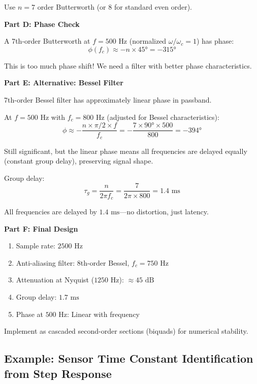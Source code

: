 \begin{example}
Use $n = 7$ order Butterworth (or 8 for standard even order).

\textbf{Part D: Phase Check}

A 7th-order Butterworth at $f = 500\text{ Hz}$ (normalized $\omega/\omega_c = 1$) has phase:
\begin{equation}
\phi(f_c) \approx -n \times 45° = -315°
\end{equation}

This is too much phase shift! We need a filter with better phase characteristics.

\textbf{Part E: Alternative: Bessel Filter}

7th-order Bessel filter has approximately linear phase in passband.

At $f = 500\text{ Hz}$ with $f_c = 800\text{ Hz}$ (adjusted for Bessel characteristics):
\begin{equation}
\phi \approx -\frac{n \times \pi/2 \times f}{f_c} = -\frac{7 \times 90° \times 500}{800} = -394°
\end{equation}

Still significant, but the linear phase means all frequencies are delayed equally (constant group delay), preserving signal shape.

Group delay:
\begin{equation}
\tau_g = \frac{n}{2\pi f_c} = \frac{7}{2\pi \times 800} = 1.4\text{ ms}
\end{equation}

All frequencies are delayed by $1.4\text{ ms}$---no distortion, just latency.

\textbf{Part F: Final Design}

\begin{enumerate}
    \item Sample rate: $2500\text{ Hz}$
    \item Anti-aliasing filter: 8th-order Bessel, $f_c = 750\text{ Hz}$
    \item Attenuation at Nyquist ($1250\text{ Hz}$): $\approx 45\text{ dB}$
    \item Group delay: $1.7\text{ ms}$
    \item Phase at $500\text{ Hz}$: Linear with frequency
\end{enumerate}

Implement as cascaded second-order sections (biquads) for numerical stability.
\end{example}

\subsection{Example: Sensor Time Constant Identification from Step Response}
\label{ex:time_const_id}

